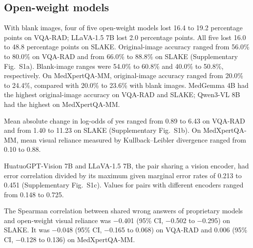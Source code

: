 \subsection{Open-weight models}
With blank images, four of five open-weight models lost 16.4 to 19.2 percentage points on VQA-RAD; LLaVA-1.5 7B lost 2.0 percentage points. All five lost 16.0 to 48.8 percentage points on SLAKE. Original-image accuracy ranged from 56.0\% to 80.0\% on VQA-RAD and from 66.0\% to 88.8\% on SLAKE (Supplementary Fig.~S1a). Blank-image ranges were 54.0\% to 60.8\% and 40.0\% to 50.8\%, respectively. On MedXpertQA-MM, original-image accuracy ranged from 20.0\% to 24.4\%, compared with 20.0\% to 23.6\% with blank images. MedGemma 4B had the highest original-image accuracy on VQA-RAD and SLAKE; Qwen3-VL 8B had the highest on MedXpertQA-MM.

Mean absolute change in log-odds of yes ranged from 0.89 to 6.43 on VQA-RAD and from 1.40 to 11.23 on SLAKE (Supplementary Fig.~S1b). On MedXpertQA-MM, mean visual reliance measured by Kullback--Leibler divergence ranged from 0.10 to 0.88.

HuatuoGPT-Vision 7B and LLaVA-1.5 7B, the pair sharing a vision encoder, had error correlation divided by its maximum given marginal error rates of 0.213 to 0.451 (Supplementary Fig.~S1c). Values for pairs with different encoders ranged from 0.148 to 0.725.

The Spearman correlation between shared wrong answers of proprietary models and open-weight visual reliance was $-$0.401 (95\% CI, $-$0.502 to $-$0.295) on SLAKE. It was $-$0.048 (95\% CI, $-$0.165 to 0.068) on VQA-RAD and 0.006 (95\% CI, $-$0.128 to 0.136) on MedXpertQA-MM.
